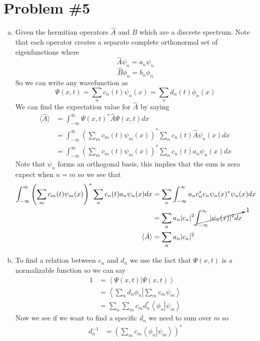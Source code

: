 \documentclass[11pt]{article}
\numberwithin{equation}{section}
\newcommand{\expt}[1]{\langle{#1}\rangle}
\newcommand{\norm}[2]{\left\langle{#1}\right|\left.{#2}\right\rangle}
\begin{document}
\section{Problem \#5}
\begin{enumerate}[(a)]
\item
Given the hermitian operators $\hat{A}$ and $\hat{B}$ which are a discrete spectrum. Note that each operator creates a separate complete orthonormal set of eigenfunctions where
$$\hat{A}\psi_n=a_n\psi_n$$
$$\hat{B}\phi_n=b_n\phi_n$$
So we can write any wavefunction as
$$\Psi(x,t) = \sum_nc_n(t)\psi_n(x) = \sum_nd_n(t)\phi_n(x)$$
We can find the expectation value for $\hat{A}$ by saying
\begin{align*}
\expt{\hat{A}} &= \int_{-\infty}^{\infty}\Psi(x,t)^*\hat{A}\Psi(x,t)dx\\
&= \int_{-\infty}^{\infty}\left(\sum_mc_m(t)\psi_m(x)\right)^*\sum_nc_n(t)\hat{A}\psi_n(x)dx\\
&= \int_{-\infty}^{\infty}\left(\sum_mc_m(t)\psi_m(x)\right)^*\sum_nc_n(t)a_n\psi_n(x)dx
\end{align*}
Note that $\psi_n$ forms an orthogonal basis, this implies that the sum is zero expect when $n=m$ so we see that
\begin{align*}
\int_{-\infty}^{\infty}\left(\sum_mc_m(t)\psi_m(x)\right)^*\sum_nc_n(t)a_n\psi_n(x)dx &= \sum_n\int_{-\infty}^{\infty}a_nc_n^*c_n\psi_n(x)^*\psi_n(x)dx\\
&= \sum_na_n|c_n|^2\cancelto{1}{\int_{-\infty}^{\infty}|\psi_n(x)|^2dx}\\
\expt{\hat{A}} &= \sum_na_n|c_n|^2
\end{align*}

\item
To find a relation between $c_n$ and $d_n$ we use the fact that $\Psi(x,t)$ is a normalizable function so we can say
\begin{align*}
1 &= \norm{\Psi(x,t)}{\Psi(x,t)}\\
&= \norm{\sum_nd_n\phi_n}{\sum_mc_m\psi_m}\\
&= \sum_n\sum_mc_md_n^*\norm{\phi_n}{\psi_m}
\end{align*}
Now we see if we want to find a specific $d_n$ we need to sum over $m$ so
\begin{align*}
d_n^{-1} &= \left(\sum_mc_m\norm{\phi_n}{\psi_m}\right)^*
\end{align*}


\end{enumerate}
\end{document}
